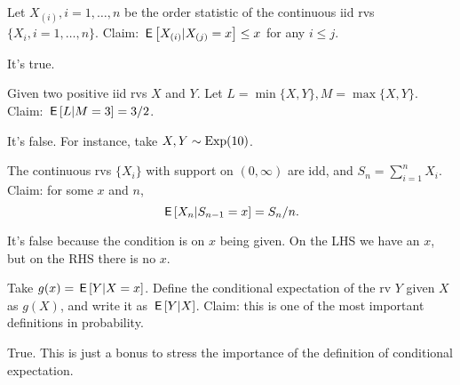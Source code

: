 \documentclass[tf-tutorial-all.tex]{subfiles}
\begin{document}



\begin{truefalse}
Let $X_{(i)}, i = 1, \ldots, n$ be the order statistic of the continuous iid rvs $\{X_{i}, i=1, \ldots, n\}$.
Claim: $\,\mathsf{E}\left[X_{(i)} | X_{(j)}=x\right] \leq x$ for any $i\leq j$.
\begin{solution}
It's true.
\end{solution}
\end{truefalse}

\begin{truefalse}
Given two positive iid rvs $X$ and $Y$. Let $L=\min\{X,  Y\}, M = \max\{X, Y\}$. Claim: $\,\mathsf{E}\left[L|M=3\right]=3/2$.

\begin{solution}
It's false. For instance, take $X, Y \sim \mathrm{Exp}(10)$.
\end{solution}
\end{truefalse}

\begin{truefalse}
The continuous rvs $\{X_{i}\}$ with support on $(0, \infty)$ are idd, and $S_n=\sum_{i=1}^n X_{i}$.
Claim: for some $x$ and $n$,
\begin{equation}
\label{eq:6}
\,\mathsf{E}\left[X_{n}| S_{n-1} = x\right] = S_n/n.
\end{equation}
\begin{solution}
It's false because the condition is on $x$ being given. On the LHS we have an $x$, but on the RHS there is no $x$.
\end{solution}
\end{truefalse}

\begin{truefalse}
Take $g(x) = \,\mathsf{E}\left[Y|X=x\right]$.
Define the conditional expectation of the rv $Y$ given $X$ as $g(X)$, and write it as $\,\mathsf{E}\left[Y|X\right]$.
Claim: this is one of the most important definitions in probability.

\begin{solution}
True. This is just a bonus to stress the importance of the definition of conditional expectation.
\end{solution}
\end{truefalse}
\end{document}
